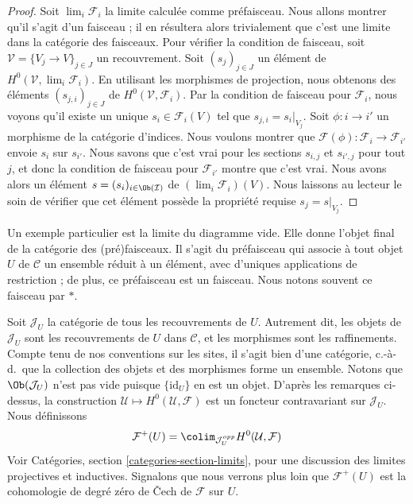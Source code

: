 \begin{proof}
Soit $\lim_i \mathcal{F}_i$ la limite calculée comme préfaisceau.
Nous allons montrer qu’il s’agit d’un faisceau ; il en résultera alors trivialement
que c’est une limite dans la catégorie des faisceaux. Pour vérifier la condition
de faisceau, soit $\mathcal{V} = \{V_j \to V\}_{j\in J}$ un recouvrement.
Soit $(s_j)_{j\in J}$ un élément de $H^0(\mathcal{V}, \lim_i \mathcal{F}_i)$.
En utilisant les morphismes de projection, nous obtenons des éléments $(s_{j, i})_{j\in J}$
de $H^0(\mathcal{V}, \mathcal{F}_i)$. Par la condition de faisceau pour
$\mathcal{F}_i$, nous voyons qu’il existe un unique $s_i \in \mathcal{F}_i(V)$
tel que $s_{j, i} = s_i|_{V_j}$. Soit $\phi : i \to i'$ un morphisme
de la catégorie d’indices. Nous voulons montrer que
$\mathcal{F}(\phi) : \mathcal{F}_i \to \mathcal{F}_{i'}$
envoie $s_i$ sur $s_{i'}$. Nous savons que c’est vrai pour les sections
$s_{i, j}$ et $s_{i', j}$ pour tout $j$, et donc la condition de faisceau
pour $\mathcal{F}_{i'}$ montre que c’est vrai. Nous avons alors un
élément $s = (s_i)_{i \in \Ob(\mathcal{I})}$ de
$(\lim_i \mathcal{F}_i)(V)$. Nous laissons au lecteur le soin de vérifier
que cet élément possède la propriété requise $s_j = s|_{V_j}$.
\end{proof}

\begin{example}
\label{example-singleton-sheaf}
Un exemple particulier est la limite du diagramme vide.
Elle donne l’objet final de la catégorie des (pré)faisceaux.
Il s’agit du préfaisceau qui associe
à tout objet $U$ de $\mathcal{C}$ un ensemble réduit à un élément, avec d’uniques
applications de restriction ; de plus, ce préfaisceau est un faisceau.
Nous notons souvent ce faisceau par $*$.
\end{example}

\noindent
Soit $\mathcal{J}_U$ la catégorie de tous les recouvrements de $U$.
Autrement dit, les objets de $\mathcal{J}_U$ sont les recouvrements
de $U$ dans $\mathcal{C}$, et les morphismes sont les raffinements.
Compte tenu de nos conventions sur les sites, il s’agit bien d’une catégorie, c.-à-d.\ que
la collection des objets et des morphismes forme un ensemble.
Notons que $\Ob(\mathcal{J}_U)$ n’est pas vide puisque
$\{\text{id}_U\}$ en est un objet. D’après les remarques
ci-dessus, la construction $\mathcal{U} \mapsto H^0(\mathcal{U}, \mathcal{F})$
est un foncteur contravariant sur $\mathcal{J}_U$.
Nous définissons
$$
\mathcal{F}^{+}(U)
=
\colim_{\mathcal{J}_U^{opp}}
H^0(\mathcal{U}, \mathcal{F})
$$
Voir Catégories, section \ref{categories-section-limits}, pour
une discussion des limites projectives et inductives. Signalons que nous
verrons plus loin que $\mathcal{F}^{+}(U)$ est la cohomologie de degré zéro de
{\v C}ech de $\mathcal{F}$ sur $U$.

